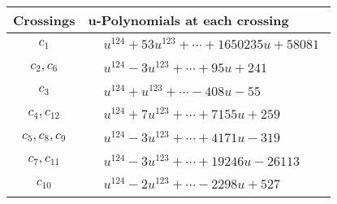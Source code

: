 \documentclass[1p]{elsarticle_modified}
\theoremstyle{definition}
\begin{document}
\begin{tabular}{m{50pt}|m{274pt}}
Crossings & \hspace{64pt}u-Polynomials at each crossing \\
\hline $$\begin{aligned}c_{1}\end{aligned}$$&$\begin{aligned}
&u^{124}+53 u^{123}+\cdots+1650235 u+58081
\end{aligned}$\\
\hline $$\begin{aligned}c_{2},c_{6}\end{aligned}$$&$\begin{aligned}
&u^{124}-3 u^{123}+\cdots+95 u+241
\end{aligned}$\\
\hline $$\begin{aligned}c_{3}\end{aligned}$$&$\begin{aligned}
&u^{124}+u^{123}+\cdots-408 u-55
\end{aligned}$\\
\hline $$\begin{aligned}c_{4},c_{12}\end{aligned}$$&$\begin{aligned}
&u^{124}+7 u^{123}+\cdots+7155 u+259
\end{aligned}$\\
\hline $$\begin{aligned}c_{5},c_{8},c_{9}\end{aligned}$$&$\begin{aligned}
&u^{124}-3 u^{123}+\cdots+4171 u-319
\end{aligned}$\\
\hline $$\begin{aligned}c_{7},c_{11}\end{aligned}$$&$\begin{aligned}
&u^{124}-3 u^{123}+\cdots+19246 u-26113
\end{aligned}$\\
\hline $$\begin{aligned}c_{10}\end{aligned}$$&$\begin{aligned}
&u^{124}-2 u^{123}+\cdots-2298 u+527
\end{aligned}$\\
\hline
\end{tabular}\\~\\
\end{document}
